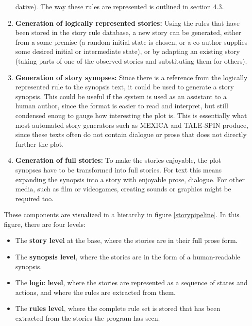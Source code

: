 \begin{enumerate}
dative). The way these rules are represented is outlined in section 4.3.
\item \textbf{Generation of logically represented stories:} Using the rules that
have been stored in the story rule database, a
new story can be generated, either from a some premise (a random initial state
is chosen, or a co-author supplies some desired initial or intermediate state), or by adapting an existing story (taking parts of one of the
observed stories and substituting them for others).
\item \textbf{Generation of story synopses:} Since there is a reference from the
logically represented rule to the synopsis text, it could be used to generate a
story synopsis. This could be useful if the system is used as an assistant to a
human author, since the format is easier to read and interpret, but still
condensed enoug to gauge how interesting the plot is. This is essentially what
most automated story generators such as MEXICA and TALE-SPIN produce, since
these texts often do not contain dialogue or prose that does not directly
further the plot.
\item \textbf{Generation of full stories:} To make the stories enjoyable, the
plot synopses have to be transformed into full stories. For text this means expanding the
synopsis into a story with enjoyable prose, dialogue. For other media, such as
film or videogames, creating sounds or graphics might be required too.
\end{enumerate}
These components are visualized in a hierarchy in figure \ref{storypipeline}. In
this figure, there are four levels:
\begin{itemize}
\item The \textbf{story level} at the base, where the stories are in their full prose form.
\item The \textbf{synopsis level}, where the stories are in the form of a human-readable
synopsis.
\item The \textbf{logic level}, where the stories are represented as a
sequence of states and actions, and where the rules are extracted from them.
\item The \textbf{rules level}, where the complete rule set is stored that has been
extracted from the stories the program has seen.
\end{itemize}

